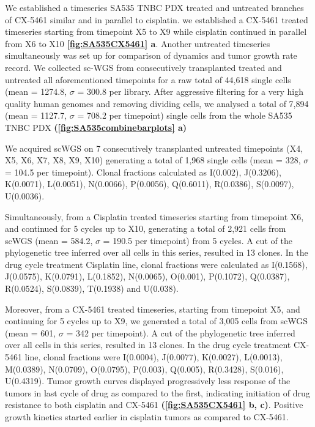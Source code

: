 We established a timeseries SA535 TNBC PDX treated and untreated branches of CX-5461 similar and in parallel to cisplatin.
we established a CX-5461 treated timeseries starting from timepoint X5 to X9 while cisplatin continued in parallel from X6 to X10  \textbf{\autoref{fig:SA535CX5461} a}. Another untreated timeseries simultaneously was set up for comparison of dynamics and tumor growth rate record.
We collected sc-WGS from consecutively transplanted treated and untreated all aforementioned timepoints for a raw total of 44,618 single cells (mean = 1274.8, $\sigma$ = 300.8 per library. After aggressive filtering for a very high quality human genomes and removing dividing cells, we analysed a total of 7,894 (mean = 1127.7, $\sigma$ = 708.2 per timepoint) single cells from the whole SA535 TNBC PDX \textbf{(\autoref{fig:SA535combinebarplots} a)}

We acquired scWGS on 7 consecutively transplanted untreated timepoints (X4, X5, X6, X7, X8, X9, X10) generating a total of 1,968 single cells (mean = 328, $\sigma$ = 104.5 per timepoint).
Clonal fractions calculated as I(0.002), J(0.3206), K(0.0071), L(0.0051), N(0.0066), P(0.0056), Q(0.6011), R(0.0386), S(0.0097), U(0.0036). 

Simultaneously, from a Cisplatin treated timeseries starting from timepoint X6, and continued for 5 cycles up to X10, generating a total of 2,921 cells from scWGS (mean = 584.2, $\sigma$ = 190.5 per timepoint) from 5 cycles. A cut of the phylogenetic tree inferred over all cells in this series, resulted in 13 clones.
In the drug cycle treatment Cisplatin line, clonal fractions were
calculated as I(0.1568), J(0.0575), K(0.0791), L(0.1852), N(0.0065), O(0.001), P(0.1072), Q(0.0387), R(0.0524), S(0.0839), T(0.1938) and U(0.038).

Moreover, from a CX-5461 treated timeseries, starting from timepoint X5, and continuing for 5 cycles up to X9, we generated a total of 3,005 cells from scWGS (mean = 601, $\sigma$ = 342 per timepoint). A cut of the phylogenetic tree inferred over all cells in this series, resulted in 13 clones. In the drug cycle treatment CX-5461 line, clonal fractions were I(0.0004), J(0.0077), K(0.0027), L(0.0013), M(0.0389), N(0.0709),  O(0.0795), P(0.003), Q(0.005), R(0.3428), S(0.016), U(0.4319).
Tumor growth curves displayed progressively less response of the tumors in last cycle of drug as compared to the first, indicating initiation of drug resistance to both cisplatin and CX-5461 \textbf{(\autoref{fig:SA535CX5461} b, c)}. Positive growth kinetics started earlier in cisplatin tumors as compared to CX-5461.


